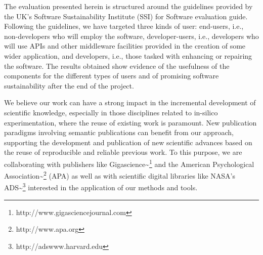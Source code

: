 The evaluation presented herein is structured around the guidelines
provided by the UK's Software Sustainability Institute (SSI) for
Software evaluation guide. Following the guidelines, we have targeted
three kinds of user: end-users, i.e., non-developers who will employ the
software, developer-users, i.e., developers who will use APIs and other
middleware facilities provided in the creation of some wider
application, and developers, i.e., those tasked with enhancing or
repairing the software. The results obtained show evidence of the
usefulness of the components for the different types of users and of
promising software sustainability after the end of the project.

We believe our work can have a strong impact in the incremental
development of scientific knowledge, especially in those disciplines
related to in-silico experimentation, where the reuse of existing work
is paramount. New publication paradigms involving semantic publications
can benefit from our approach, supporting the development and
publication of new scientific advances based on the reuse of
reproducible and reliable previous work. To this purpose, we are
collaborating with publishers like
Gigascience\textasciitilde{}\footnote{http://www.gigasciencejournal.com}
and the American Psychological
Association\textasciitilde{}\footnote{http://www.apa.org} (APA) as well
as with scientific digital libraries like NASA's
ADS\textasciitilde{}\footnote{http://adswww.harvard.edu} interested in
the application of our methods and tools.
